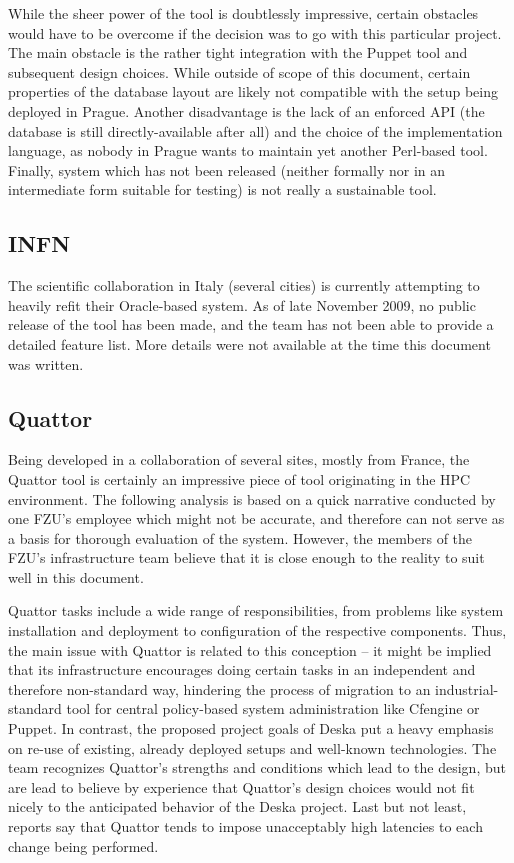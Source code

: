 \documentclass[12pt]{article}
\begin{document}
While the sheer power of the tool is doubtlessly impressive, certain obstacles would have to be overcome if the decision was to go
with this particular project.  The main obstacle is the rather tight integration with the Puppet tool and subsequent design
choices.  While outside of scope of this document, certain properties of the database layout are likely not compatible with the
setup being deployed in Prague.  Another disadvantage is the lack of an enforced API (the database is still directly-available
after all) and the choice of the implementation language, as nobody in Prague wants to maintain yet another Perl-based tool.
Finally, system which has not been released (neither formally nor in an intermediate form suitable for testing) is not really a
sustainable tool.

\subsection{INFN}
The scientific collaboration in Italy (several cities) is currently attempting to heavily refit their Oracle-based system.  As
of late November 2009, no public release of the tool has been made, and the team has not been able to provide a detailed feature
list.  More details were not available at the time this document was written.

\subsection{Quattor}
Being developed in a collaboration of several sites, mostly from France, the Quattor tool is certainly an impressive piece of tool
originating in the HPC environment.  The following analysis is based on a quick narrative conducted by one FZU's employee which
might not be accurate, and therefore can not serve as a basis for thorough evaluation of the system.  However, the members of the
FZU's infrastructure team believe that it is close enough to the reality to suit well in this document.

Quattor tasks include a wide range of responsibilities, from problems like system installation and deployment to configuration of
the respective components.  Thus, the main issue with Quattor is related to this conception -- it might be implied that its
infrastructure encourages doing certain tasks in an independent and therefore non-standard way, hindering the process of migration
to an industrial-standard tool for central policy-based system administration like Cfengine or Puppet.  In contrast, the proposed
project goals of Deska put a heavy emphasis on re-use of existing, already deployed setups and well-known technologies.  The team
recognizes Quattor's strengths and conditions which lead to the design, but are lead to believe by experience that Quattor's
design choices would not fit nicely to the anticipated behavior of the Deska project.  Last but not least, reports say that
Quattor tends to impose unacceptably high latencies to each change being performed.
\end{document}
